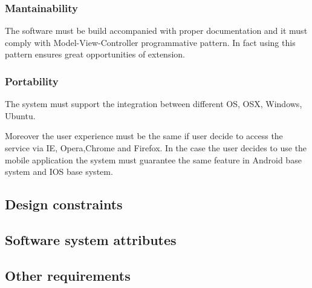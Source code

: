 \subsubsection{Mantainability}
The software must be build accompanied with proper documentation and it must comply with Model-View-Controller programmative pattern. In fact using this pattern ensures great opportunities of extension.
\subsubsection{Portability}
The system must support the integration between different OS, OSX, Windows, Ubuntu. \par Moreover the user experience must be the same if user decide to access the service via IE, Opera,Chrome and Firefox. In the case the user decides to use the mobile application the system must guarantee the same feature in Android base system and IOS base system.
\subsection{Design constraints}
\subsection{Software system attributes}
\subsection{Other requirements}
